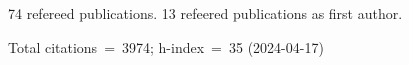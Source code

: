 74 refereed publications. 13 refeered publications as first author.

Total citations~=~3974; h-index~=~35 (2024-04-17)